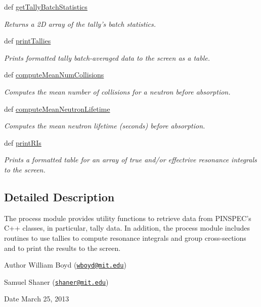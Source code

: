 \begin{DoxyCompactItemize}
def \hyperlink{namespacepinspec_1_1process_ad8268b637d8441c8f3adf739d2682029}{get\-Tally\-Batch\-Statistics}
\begin{DoxyCompactList}\small\item\em Returns a 2\-D array of the tally's batch statistics. \end{DoxyCompactList}\item 
def \hyperlink{namespacepinspec_1_1process_a6cf809df65f0a24714f69a080add30b2}{print\-Tallies}
\begin{DoxyCompactList}\small\item\em Prints formatted tally batch-\/averaged data to the screen as a table. \end{DoxyCompactList}\item 
def \hyperlink{namespacepinspec_1_1process_afb8cb723f05702c6ab466ef4ffda7a8e}{compute\-Mean\-Num\-Collisions}
\begin{DoxyCompactList}\small\item\em Computes the mean number of collisions for a neutron before absorption. \end{DoxyCompactList}\item 
def \hyperlink{namespacepinspec_1_1process_a5a89290e473b171ac1f535ef361e1e83}{compute\-Mean\-Neutron\-Lifetime}
\begin{DoxyCompactList}\small\item\em Computes the mean neutron lifetime (seconds) before absorption. \end{DoxyCompactList}\item 
def \hyperlink{namespacepinspec_1_1process_abca578c733031cbf54954e15df72a385}{print\-R\-Is}
\begin{DoxyCompactList}\small\item\em Prints a formatted table for an array of true and/or effectrive resonance integrals to the screen. \end{DoxyCompactList}\end{DoxyCompactItemize}


\subsection{Detailed Description}
The process module provides utility functions to retrieve data from P\-I\-N\-S\-P\-E\-C's C++ classes, in particular, tally data. In addition, the process module includes routines to use tallies to compute resonance integrals and group cross-\/sections and to print the results to the screen.

\begin{DoxyAuthor}{Author}
William Boyd (\href{mailto:wboyd@mit.edu}{\tt wboyd@mit.\-edu}) 

Samuel Shaner (\href{mailto:shaner@mit.edu}{\tt shaner@mit.\-edu}) 
\end{DoxyAuthor}
\begin{DoxyDate}{Date}
March 25, 2013 
\end{DoxyDate}


